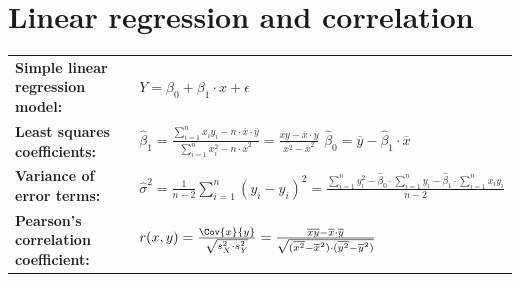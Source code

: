 \documentclass[11pt,a4paper,english]{article} %
\begin{document}
\section*{Linear regression and correlation}
\begin{center}
    \renewcommand{\arraystretch}{1.8}
    \begin{tabular}{m{}m{}}
        \textbf{Simple linear regression \newline model:} & $Y = \beta_0 + \beta_1 \cdot x + \epsilon$ \\
        \textbf{Least squares coefficients:} & $\hat{\beta}_{1} = \frac{\sum_{i=1}^{n}x_iy_i - n \cdot \overline{x} \cdot \overline{y}}{\sum_{i=1}^{n} x_{i}^2 - n \cdot \overline{x}^2} = \frac{\overline{xy}-\overline{x}\cdot \overline{y}}{\overline{x^2}-\overline{x}^2}$ \newline
                                                $\hat{\beta}_{0} = \overline{y} - \hat{\beta}_{1} \cdot \overline{x}$ \\
        \textbf{Variance of error terms:} & $\hat{\sigma}^2 = \frac{1}{n-2}\sum_{i=1}^{n} (y_{i} - \hat{y}_{i})^2 = \frac{\sum_{i=1}^{n} y_{i}^2 - \hat{\beta}_{0}\cdot \sum_{i=1}^{n} y_{i} - \hat{\beta}_{1}\cdot \sum_{i=1}^{n} x_{i}y_{i}}{n-2}$ \\
        \textbf{Pearson's correlation \newline coefficient:} & $r(x, y) = \frac{\Cov{x}{y}}{\sqrt{s_{X}^2\cdot s_{Y}^2}} = \frac{\overline{xy} - \overline{x} \cdot \overline{y}}{\sqrt{(\overline{x^2} - \overline{x}^2)\cdot(\overline{y^2} - \overline{y}^2)}}$
    \end{tabular}
\end{center}
\end{document}
